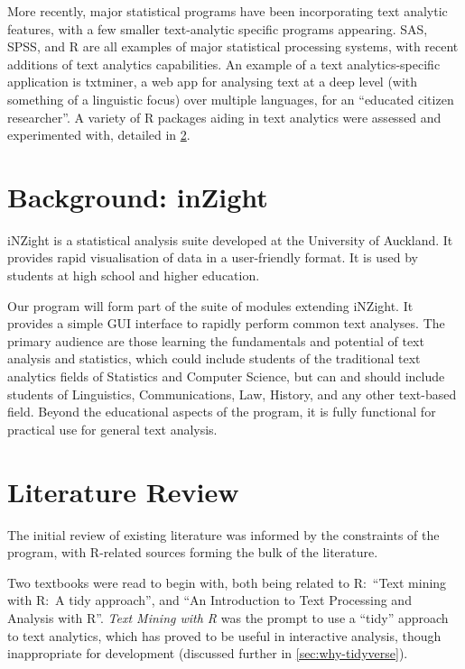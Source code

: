\documentclass[11pt, a4paper, twoside, titlepage]{report}
\begin{document}
More recently, major statistical programs have been incorporating text
analytic features, with a few smaller text-analytic specific programs
appearing. SAS\autocite{inc.19:_sas_text_miner},
SPSS\autocite{corp.17:_ibm_spss_statis_window_version}, and
R\autocite{team19:_r} are all examples of major statistical processing
systems, with recent additions of text analytics capabilities. An
example of a text analytics-specific application is txtminer, a web
app for analysing text at a deep level (with something of a linguistic
focus) over multiple languages, for an ``educated citizen
researcher''\autocite{bnosac19:_autom_text_analy}. A variety of R
packages aiding in text analytics were assessed and experimented with,
detailed in \cref{sec:liter-revi-exist}.

\section{Background: inZight}\label{sec:background:-inzight}

iNZight is a statistical analysis suite developed at the University of
Auckland\autocite{wild:_data_analy}. It provides rapid visualisation
of data in a user-friendly format. It is used by students at high
school and higher education.

Our program will form part of the suite of modules extending iNZight.
It provides a simple GUI interface to rapidly perform common text
analyses. The primary audience are those learning the fundamentals and
potential of text analysis and statistics, which could include
students of the traditional text analytics fields of Statistics and
Computer Science, but can and should include students of Linguistics,
Communications, Law, History, and any other text-based field. Beyond
the educational aspects of the program, it is fully functional for
practical use for general text analysis.

\section{Literature Review}\label{sec:liter-revi-exist}

The initial review of existing literature was informed by the
constraints of the program, with R-related sources forming the bulk of
the literature.

Two textbooks were read to begin with, both being related to R:\
``Text mining with R:~A tidy approach''\autocite{silge2017text}, and
``An Introduction to Text Processing and Analysis with
R''\autocite{clark2019text}. \textit{Text Mining with R} was the
prompt to use a ``tidy'' approach to text analytics, which has proved
to be useful in interactive analysis, though inappropriate for
development (discussed further in \cref{sec:why-tidyverse}).
\end{document}
